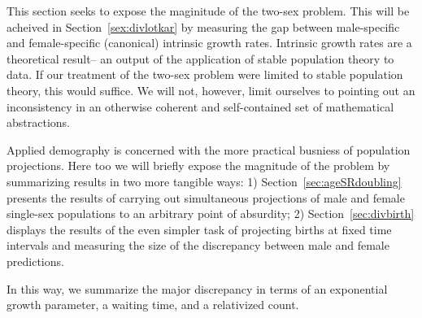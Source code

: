 
This section seeks to expose the maginitude of the two-sex problem. This will be
acheived in Section~\ref{sex:divlotkar} by measuring the gap between
male-specific and female-specific (canonical) intrinsic growth rates. Intrinsic growth rates are a
theoretical result-- an output of the application of stable population 
theory to data. If our treatment of the two-sex problem were limited to 
stable population theory, this would suffice. We will not, however, limit
ourselves to pointing out an inconsistency in an otherwise coherent and
self-contained set of mathematical abstractions. 

Applied demography is concerned with the more practical
busniess of population projections. Here too we will briefly
expose the magnitude of the problem by summarizing results in two more tangible
ways: 1) Section~\ref{sec:ageSRdoubling} presents the results of carrying out
simultaneous projections of male and female single-sex populations to an 
arbitrary point of absurdity; 2) Section~\ref{sec:divbirth} displays the
results of the even simpler task of projecting births at fixed time intervals
and measuring the size of the discrepancy between male and female predictions.

In this way, we summarize the major discrepancy in terms of an exponential
growth parameter, a waiting time, and a relativized count.

